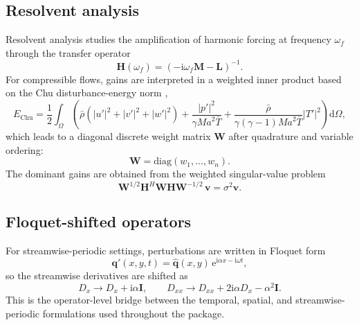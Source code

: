 \documentclass[11pt]{article}
\newcommand{\dd}{\mathrm{d}}
\newcommand{\Ma}{\mathit{Ma}}
\newcommand{\bq}{\mathbf{q}}
\newcommand{\bqp}{\mathbf{q}'}
\newcommand{\bH}{\mathbf{H}}
\newcommand{\bI}{\mathbf{I}}
\newcommand{\bL}{\mathbf{L}}
\newcommand{\bM}{\mathbf{M}}
\newcommand{\bW}{\mathbf{W}}
\newcommand{\bv}{\mathbf{v}}
\begin{document}
\subsection{Resolvent analysis}
\label{sec:resolvent}

Resolvent analysis studies the amplification of harmonic forcing at frequency
$\omega_f$ through the transfer operator
\begin{equation}
  \bH(\omega_f) = (-\mathrm{i}\omega_f \bM - \bL)^{-1}.
  \label{eq:resolvent_op}
\end{equation}
For compressible flows, gains are interpreted in a weighted inner product based
on the Chu disturbance-energy norm \citep{chu1965energy,hanifi1996compressible},
\begin{equation}
  E_{\mathrm{Chu}}
  = \frac{1}{2}\int_\Omega
  \left(
    \bar{\rho} (|u'|^2 + |v'|^2 + |w'|^2)
    + \frac{|p'|^2}{\gamma \Ma^2 \bar{T}}
    + \frac{\bar{\rho}}{\gamma(\gamma-1)\Ma^2 \bar{T}} |T'|^2
  \right)\dd\Omega,
  \label{eq:chu_norm}
\end{equation}
which leads to a diagonal discrete weight matrix $\bW$ after quadrature and
variable ordering:
\begin{equation}
  \bW = \mathrm{diag}(w_1,\ldots,w_n).
  \label{eq:W_diag}
\end{equation}
The dominant gains are obtained from the weighted singular-value problem
\begin{equation}
  \bW^{1/2}\bH^H\bW\bH\bW^{-1/2}\,\bv = \sigma^2 \bv.
  \label{eq:weighted_svd}
\end{equation}

\subsection{Floquet-shifted operators}
\label{sec:floquet}

For streamwise-periodic settings, perturbations are written in Floquet form
\begin{equation}
  \bqp(x,y,t)
  = \hat{\bq}(x,y)\,\mathrm{e}^{\mathrm{i}\alpha x-\mathrm{i}\omega t},
\end{equation}
so the streamwise derivatives are shifted as
\begin{equation}
  D_x \rightarrow D_x + \mathrm{i}\alpha \bI,
  \qquad
  D_{xx} \rightarrow D_{xx} + 2\mathrm{i}\alpha D_x - \alpha^2 \bI.
  \label{eq:floquet_shift}
\end{equation}
This is the operator-level bridge between the temporal, spatial, and
streamwise-periodic formulations used throughout the package.
\end{document}
